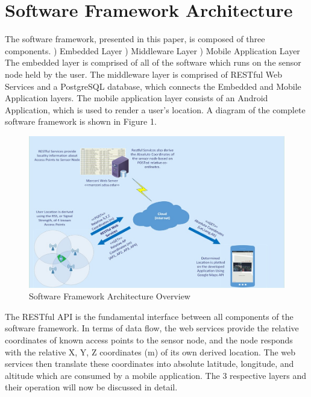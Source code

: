 \documentclass[conference]{IEEEtran}
\begin{document}
\section{Software Framework Architecture}
The software framework, presented in this paper, is composed of three components.
) Embedded Layer
) Middleware Layer
) Mobile Application Layer
\newline
The embedded layer is comprised of all of the software which runs on the sensor node held by the user.
The middleware layer is comprised of RESTful Web Services and a PostgreSQL database, which connects the Embedded and Mobile Application layers.
The mobile application layer consists of an Android Application, which is used to render a user's location.
A diagram of the complete software framework is shown in Figure 1.
\begin{figure}[H]
    \includegraphics[width=9 cm,height=5.5 cm]{2018-05-10-PHOTO-00000077.jpg}
    \caption{Software Framework Architecture Overview}
    \end{figure}
The RESTful API is the fundamental interface between all components of the software framework. In terms of data flow, the web services provide the relative coordinates of known access points to the sensor node, and the node responds with the relative X, Y, Z coordinates (m) of its own derived location. The web services then translate these coordinates into absolute latitude, longitude, and altitude which are consumed by a mobile application.
The 3 respective layers and their operation will now be discussed in detail.
\end{document}
